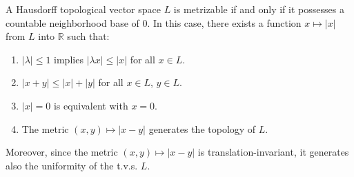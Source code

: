 A Hausdorff topological vector space $L$ is metrizable if and only if it possesses a countable neighborhood base of $0$. In this case, there exists a function $x \mapsto |x|$ from $L$ into $\mathbb{R}$ such that:
\begin{enumerate}
\item[(i)] $|\lambda| \leq 1$ implies $|\lambda x| \leq |x|$ for all $x \in L$.
\item[(ii)] $|x + y| \leq |x| + |y|$ for all $x \in L$, $y \in L$.
\item[(iii)] $|x| = 0$ is equivalent with $x = 0$.
\item[(iv)] The metric $(x, y) \mapsto |x - y|$ generates the topology of $L$.
\end{enumerate}
Moreover, since the metric $(x,y) \mapsto |x-y|$ is translation-invariant, it generates also the uniformity of the t.v.s. $L$.
